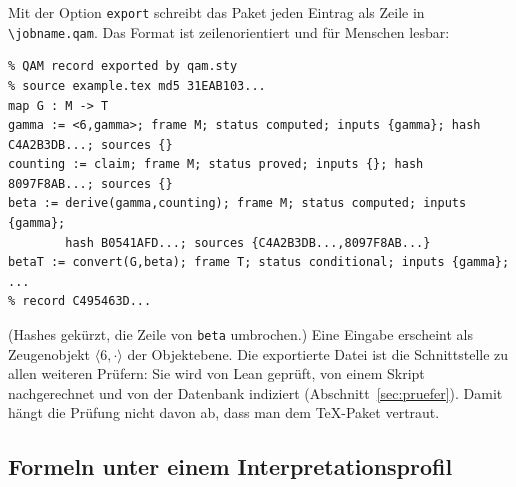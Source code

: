 Mit der Option \texttt{export} schreibt das Paket jeden Eintrag als Zeile in \texttt{\textbackslash jobname.qam}. Das Format ist
zeilenorientiert und für Menschen lesbar:
\begin{lstlisting}
% QAM record exported by qam.sty
% source example.tex md5 31EAB103...
map G : M -> T
gamma := <6,gamma>; frame M; status computed; inputs {gamma}; hash C4A2B3DB...; sources {}
counting := claim; frame M; status proved; inputs {}; hash 8097F8AB...; sources {}
beta := derive(gamma,counting); frame M; status computed; inputs {gamma};
        hash B0541AFD...; sources {C4A2B3DB...,8097F8AB...}
betaT := convert(G,beta); frame T; status conditional; inputs {gamma}; ...
% record C495463D...
\end{lstlisting}
(Hashes gekürzt, die Zeile von \texttt{beta} umbrochen.) Eine Eingabe erscheint als Zeugenobjekt \(\langle6,\cdot\rangle\) der
Objektebene. Die exportierte Datei ist die Schnittstelle zu allen weiteren Prüfern: Sie wird von Lean geprüft, von einem Skript
nachgerechnet und von der Datenbank indiziert (Abschnitt~\ref{sec:pruefer}). Damit hängt die Prüfung nicht davon ab, dass man dem
\TeX-Paket vertraut.

\subsection{Formeln unter einem Interpretationsprofil}\label{sec:profile}

